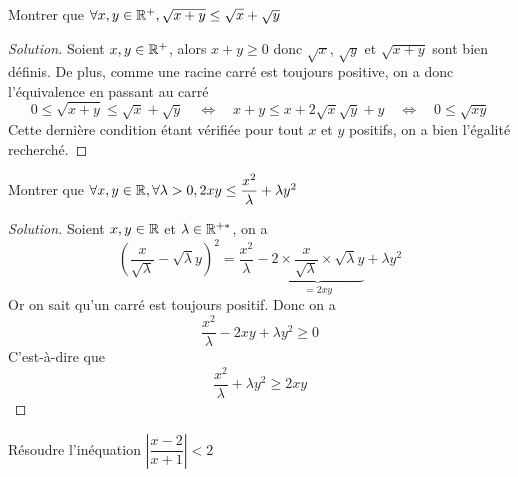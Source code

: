 \documentclass{classe}
\newenvironment{solution}
  {\renewcommand\qedsymbol{$\blacksquare$}\begin{proof}[Solution]}
  {\end{proof}}
\begin{document}
\begin{exercice}
Montrer que $\forall x,y\in\mathbb{R}^+,\sqrt{x+y}\le\sqrt{x}+\sqrt{y}$
\end{exercice}

\begin{solution}
Soient $x, y \in \mathbb{R}^+$, alors $x+y \ge 0$ donc $\sqrt{x}$, $\sqrt{y}$ et $\sqrt{x+y}$ sont bien définis. De plus, comme une racine carré est toujours positive, on a donc l'équivalence en passant au carré
\[
0\le\sqrt{x+y}\le\sqrt{x}+\sqrt{y}
\quad\Leftrightarrow\quad
x + y \le x + 2 \sqrt{x}\sqrt{y} + y 
\quad\Leftrightarrow\quad
0 \le \sqrt{xy}
\] 
Cette dernière condition étant vérifiée pour tout $x$ et $y$ positifs, on a bien l'égalité recherché.
\end{solution}

\begin{exercice}
Montrer que $\forall x,y\in\mathbb{R}, \forall\lambda>0, 2xy\le\dfrac{x^2}{\lambda}+\lambda y^2$
\end{exercice}

\begin{solution}
Soient $x, y \in \mathbb{R}$ et $\lambda \in \mathbb{R}^{+*}$, on a \[
\left(\dfrac{x}{\sqrt{\lambda}} - \sqrt{\lambda} y\right)^2 = \dfrac{x^2}{\lambda} - \underbrace{2 \times \dfrac{x}{\sqrt{\lambda}}\times \sqrt{\lambda} y}_{=2xy} +\lambda y^2
\]
Or on sait qu'un carré est toujours positif. Donc on a
\[
\dfrac{x^2}{\lambda} - 2xy +\lambda y^2 \ge 0
\]
C'est-à-dire que
\[
\dfrac{x^2}{\lambda} +\lambda y^2 \ge 2xy
\]
\end{solution}

\begin{exercice}
Résoudre l'inéquation $\left|\dfrac{x-2}{x+1}\right|<2$
\end{exercice}
\end{document}
